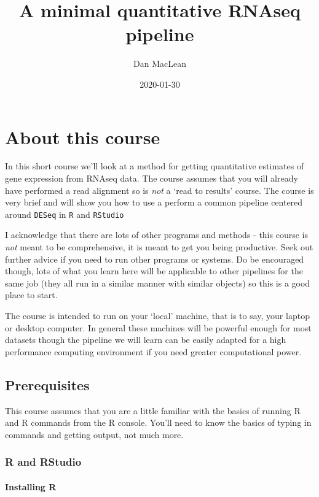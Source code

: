 \documentclass[]{book}
\title{A minimal quantitative RNAseq pipeline}
\author{Dan MacLean}
\date{2020-01-30}
\begin{document}
\maketitle

{
\setcounter{tocdepth}{1}
\tableofcontents
}
\hypertarget{about-this-course}{%
\chapter{About this course}\label{about-this-course}}

In this short course we'll look at a method for getting quantitative estimates of gene expression from RNAseq data. The course assumes that you will already have performed a read alignment so is \emph{not} a `read to results' course. The course is very brief and will show you how to use a perform a common pipeline centered around \texttt{DESeq} in \texttt{R} and \texttt{RStudio}

I acknowledge that there are lots of other programs and methods - this course is \emph{not} meant to be comprehensive, it is meant to get you being productive. Seek out further advice if you need to run other programs or systems. Do be encouraged though, lots of what you learn here will be applicable to other pipelines for the same job (they all run in a similar manner with similar objects) so this is a good place to start.

The course is intended to run on your `local' machine, that is to say, your laptop or desktop computer. In general these machines will be powerful enough for most datasets though the pipeline we will learn can be easily adapted for a high performance computing environment if you need greater computational power.

\hypertarget{prerequisites}{%
\section{Prerequisites}\label{prerequisites}}

This course assumes that you are a little familiar with the basics of running R and R commands from the R console. You'll need to know the basics of typing in commands and getting output, not much more.

\hypertarget{r-and-rstudio}{%
\subsection{R and RStudio}\label{r-and-rstudio}}

\hypertarget{installing-r}{%
\subsubsection{Installing R}\label{installing-r}}
\end{document}

